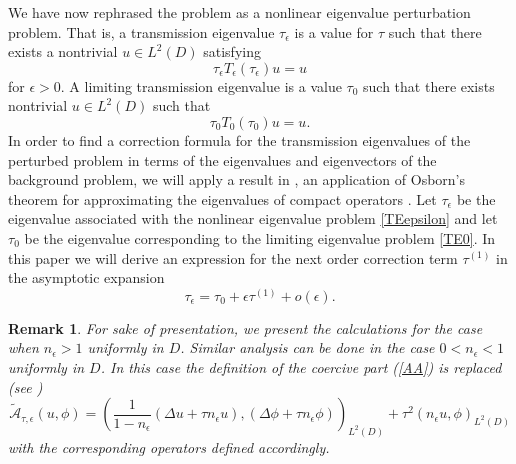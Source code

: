 \documentclass[10pt,a4paper]{amsart}
\newtheorem{remark}{Remark}
\begin{document}
\noindent
We have now rephrased the problem as a nonlinear eigenvalue perturbation problem. That is, a transmission eigenvalue $\tau_\epsilon$  is a value for $\tau$ such that there exists a nontrivial $u\in L^2(D)$ satisfying
$$\tau_\epsilon T_\epsilon(\tau_\epsilon) u = u$$
for $\epsilon>0$. A limiting transmission eigenvalue is a value $\tau_0$ such that there exists nontrivial $u\in L^2(D)$ such that
$$\tau_0 T_0(\tau_0) u = u.$$
In order to find a correction formula for the transmission eigenvalues of the perturbed problem in terms of the eigenvalues and eigenvectors of the background problem, we will apply a result in \cite{Mo}, an application of Osborn's theorem for approximating the eigenvalues of compact operators \cite{Os}.  
Let $\tau_\epsilon$ be the eigenvalue associated with the nonlinear eigenvalue problem \eqref{TEepsilon}
and let $\tau_0$ be the eigenvalue corresponding to the limiting eigenvalue problem
\eqref{TE0}.
In this paper we will derive an expression for the next order correction term $\tau^{(1)}$ in the asymptotic expansion
\begin{equation*}
\tau_\epsilon = \tau_0+ \epsilon\tau^{(1)} + o(\epsilon ).
\end{equation*} 
\begin{remark}
{\em For sake of presentation, we present the calculations for the case when $n_\epsilon>1$ uniformly in $D$. Similar analysis can be done in the case $0<n_\epsilon<1$ uniformly in $D$. In this case the definition of the coercive part  (\ref{AA}) is replaced  (see \cite[Section 4.2]{CCH-book})
$$
\tilde{\mathcal{A}}_{\tau,\epsilon}(u,\phi)= \left ( 
\frac{1}{1-n_\epsilon}(\Delta u + \tau n_\epsilon u), (\Delta \phi + \tau n_\epsilon  \phi)
\right )_{L^2(D)} + \tau^2 (n_\epsilon u,\phi)_{L^2(D)}
$$
with the corresponding operators defined accordingly.}
\end{remark}
\end{document}
